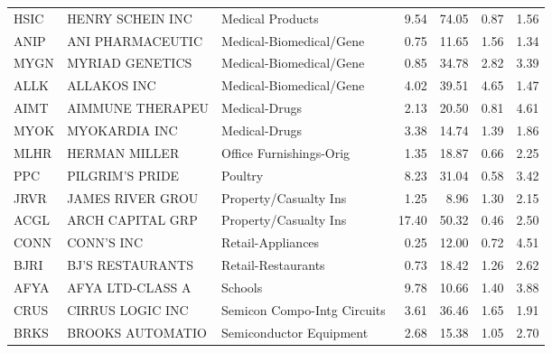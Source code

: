 \begin{table}
\begin{tabular}{lllrrrr}
  HSIC &  HENRY SCHEIN INC &             Medical Products &        9.54 &           74.05 &        0.87 &      1.56 \\
  ANIP &  ANI PHARMACEUTIC &      Medical-Biomedical/Gene &        0.75 &           11.65 &        1.56 &      1.34 \\
  MYGN &   MYRIAD GENETICS &      Medical-Biomedical/Gene &        0.85 &           34.78 &        2.82 &      3.39 \\
  ALLK &       ALLAKOS INC &      Medical-Biomedical/Gene &        4.02 &           39.51 &        4.65 &      1.47 \\
  AIMT &  AIMMUNE THERAPEU &                Medical-Drugs &        2.13 &           20.50 &        0.81 &      4.61 \\
  MYOK &     MYOKARDIA INC &                Medical-Drugs &        3.38 &           14.74 &        1.39 &      1.86 \\
  MLHR &     HERMAN MILLER &      Office Furnishings-Orig &        1.35 &           18.87 &        0.66 &      2.25 \\
   PPC &   PILGRIM'S PRIDE &                      Poultry &        8.23 &           31.04 &        0.58 &      3.42 \\
  JRVR &  JAMES RIVER GROU &        Property/Casualty Ins &        1.25 &            8.96 &        1.30 &      2.15 \\
  ACGL &  ARCH CAPITAL GRP &        Property/Casualty Ins &       17.40 &           50.32 &        0.46 &      2.50 \\
  CONN &        CONN'S INC &            Retail-Appliances &        0.25 &           12.00 &        0.72 &      4.51 \\
  BJRI &  BJ'S RESTAURANTS &           Retail-Restaurants &        0.73 &           18.42 &        1.26 &      2.62 \\
  AFYA &  AFYA LTD-CLASS A &                      Schools &        9.78 &           10.66 &        1.40 &      3.88 \\
  CRUS &  CIRRUS LOGIC INC &  Semicon Compo-Intg Circuits &        3.61 &           36.46 &        1.65 &      1.91 \\
  BRKS &  BROOKS AUTOMATIO &      Semiconductor Equipment &        2.68 &           15.38 &        1.05 &      2.70 \\
\bottomrule
\end{tabular}
\end{table}

